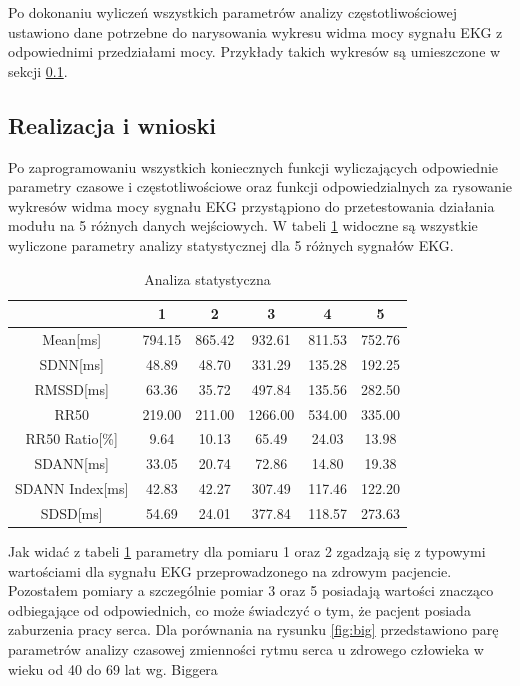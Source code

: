 \vspace{10mm}

Po dokonaniu wyliczeń wszystkich parametrów analizy częstotliwościowej ustawiono dane potrzebne
do narysowania wykresu widma mocy sygnału EKG z odpowiednimi przedziałami mocy. Przykłady takich wykresów są umieszczone
w sekcji \ref{sec:rezultat}.

\subsection{Realizacja i wnioski}
\label{sec:rezultat}

\tab Po zaprogramowaniu wszystkich koniecznych funkcji wyliczających odpowiednie parametry czasowe i częstotliwościowe oraz funkcji odpowiedzialnych za rysowanie wykresów widma mocy sygnału EKG przystąpiono do przetestowania działania modułu na 5 różnych  danych wejściowych. W tabeli \ref{tab:stats} widoczne są wszystkie wyliczone parametry analizy statystycznej dla 5 różnych sygnałów EKG.

\vspace{5mm}

\begin{table}[ht]
\caption{Analiza statystyczna}
\label{tab:stats}
\begin{tabular}{|c|c|c|c|c|c|}
 \hline
 & 1 & 2 & 3 & 4 & 5\\
\hline
Mean[ms] & 794.15  & 865.42 & 932.61 & 811.53 & 752.76\\
SDNN[ms] & 48.89 & 48.70 & 331.29 & 135.28 & 192.25\\
RMSSD[ms] & 63.36 & 35.72 & 497.84 & 135.56 & 282.50\\
RR50 & 219.00 & 211.00 & 1266.00 & 534.00 & 335.00\\
RR50 Ratio[\%] & 9.64 & 10.13 & 65.49 & 24.03 & 13.98\\
SDANN[ms] & 33.05 & 20.74 & 72.86 & 14.80 & 19.38\\
SDANN Index[ms] & 42.83 & 42.27 & 307.49 & 117.46 & 122.20\\
SDSD[ms] & 54.69 & 24.01 & 377.84 & 118.57 & 273.63\\
\hline
\end{tabular}
\end{table}

\vspace{5mm}

Jak widać z tabeli \ref{tab:stats} parametry dla pomiaru 1 oraz 2 zgadzają się z typowymi wartościami dla sygnału EKG przeprowadzonego na zdrowym pacjencie. Pozostałem pomiary a szczególnie pomiar 3 oraz 5 posiadają wartości znacząco odbiegające od odpowiednich, co może świadczyć o tym, że pacjent posiada zaburzenia pracy serca.
Dla porównania na rysunku \ref{fig:big} przedstawiono parę parametrów analizy czasowej zmienności rytmu serca u zdrowego człowieka w wieku od 40 do 69 lat wg. Biggera

